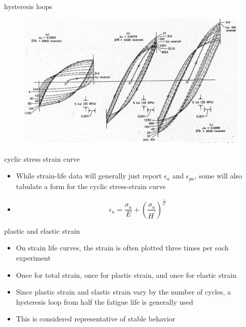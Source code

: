 \documentclass[10pt]{beamer}
\begin{document}
\begin{frame}{hysteresis loops}
	\begin{figure}
	\centering
	\includegraphics[width=0.7\linewidth]{"../Figures/hysteresis_loops"}
	\label{fig:hysteresisloops}
\end{figure}
\end{frame}

\begin{frame}{cyclic stress strain curve}
	\begin{itemize}[<+->]
		\item While strain-life data will generally just report $\epsilon_a$ and $\epsilon_{pa}$, some will also tabulate a form for the cyclic stress-strain curve
		\item[] \begin{equation}
		\epsilon_a = \frac{\sigma_a}{E} + \left(\frac{\sigma_a}{H^\prime}\right)^{\frac{1}{n^\prime}}
		\end{equation}
	\end{itemize}
\end{frame}

\begin{frame}{plastic and elastic strain}
	\begin{itemize}[<+->]
		\item On strain life curves, the strain is often plotted three times per each experiment
		\item Once for total strain, once for plastic strain, and once for elastic strain
		\item Since plastic strain and elastic strain vary by the number of cycles, a hysteresis loop from half the fatigue life is generally used
		\item This is considered representative of stable behavior
	\end{itemize}
\end{frame}
\end{document}
